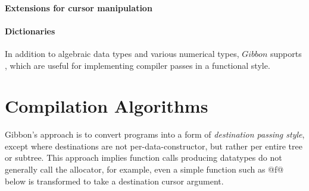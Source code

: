 \documentclass[a4paper,english]{lipics-v2016}
\newcommand{\treelang}{Gibbon\xspace} %
\begin{document}


\paragraph*{Extensions for cursor manipulation}




\paragraph*{Dictionaries}

In addition to algebraic data types and various numerical types, $\treelang{}$ supports
, which are useful for implementing compiler
passes in a functional style.





\section{Compilation Algorithms} \label{sec:compiler}

\treelang{}'s approach is to convert programs into a form of {\em destination
  passing style}, except where destinations are not per-data-constructor, but
rather per entire tree or subtree.  This approach implies function calls
producing datatypes do not generally call the allocator, for example, even a
simple function such as @f@ below is transformed to take a destination cursor
argument.
\end{document}
